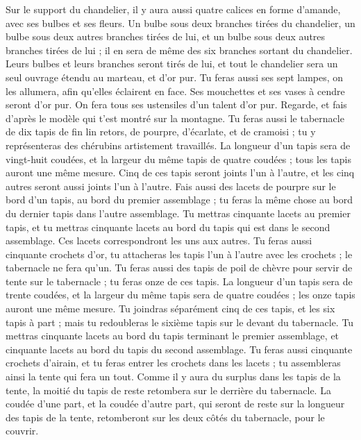\begin{multicols}{2}
Sur le support du chandelier, il y aura aussi quatre calices en forme d'amande, avec ses bulbes et ses fleurs.
Un bulbe sous deux branches tirées du chandelier, un bulbe sous deux autres branches tirées de lui, et un bulbe sous deux autres branches tirées de lui ; il en sera de même des six branches sortant du chandelier.
Leurs bulbes et leurs branches seront tirés de lui, et tout le chandelier sera un seul ouvrage étendu au marteau, et d’or pur.
Tu feras aussi ses sept lampes, on les allumera, afin qu'elles éclairent en face.
Ses mouchettes et ses vases à cendre seront d’or pur.
On fera tous ses ustensiles d'un talent d’or pur.
Regarde, et fais d’après le modèle qui t'est montré sur la montagne.
\VerseOne{}Tu feras aussi le tabernacle de dix tapis de fin lin retors, de pourpre, d'écarlate, et de cramoisi ; tu y représenteras des chérubins artistement travaillés\FTNT{}.
La longueur d'un tapis sera de vingt-huit coudées, et la largeur du même tapis de quatre coudées ; tous les tapis auront une même mesure.
Cinq de ces tapis seront joints l'un à l'autre, et les cinq autres seront aussi joints l'un à l'autre.
Fais aussi des lacets de pourpre sur le bord d'un tapis, au bord du premier assemblage ; tu feras la même chose au bord du dernier tapis dans l'autre assemblage.
Tu mettras cinquante lacets au premier tapis, et tu mettras cinquante lacets au bord du tapis qui est dans le second assemblage. Ces lacets correspondront les uns aux autres.
Tu feras aussi cinquante crochets d'or, tu attacheras les tapis l'un à l'autre avec les crochets ; le tabernacle ne fera qu’un.
Tu feras aussi des tapis de poil de chèvre pour servir de tente sur le tabernacle ; tu feras onze de ces tapis.
La longueur d'un tapis sera de trente coudées, et la largeur du même tapis sera de quatre coudées ; les onze tapis auront une même mesure.
Tu joindras séparément cinq de ces tapis, et les six tapis à part ; mais tu redoubleras le sixième tapis sur le devant du tabernacle.
Tu mettras cinquante lacets au bord du tapis terminant le premier assemblage, et cinquante lacets au bord du tapis du second assemblage.
Tu feras aussi cinquante crochets d'airain, et tu feras entrer les crochets dans les lacets ; tu assembleras ainsi la tente qui fera un tout.
Comme il y aura du surplus dans les tapis de la tente, la moitié du tapis de reste retombera sur le derrière du tabernacle.
La coudée d’une part, et la coudée d’autre part, qui seront de reste sur la longueur des tapis de la tente, retomberont sur les deux côtés du tabernacle, pour le couvrir.

\end{multicols}
